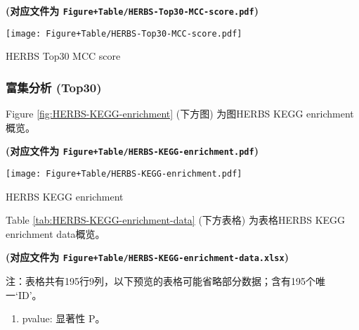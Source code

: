 \documentclass[
]{article}
\providecommand{\tightlist}{%
  \setlength{\itemsep}{0pt}\setlength{\parskip}{0pt}}
\begin{document}
\textbf{(对应文件为 \texttt{Figure+Table/HERBS-Top30-MCC-score.pdf})}

\def\@captype{figure}
\begin{center}
\texttt{[image: Figure+Table/HERBS-Top30-MCC-score.pdf]}
\caption{HERBS Top30 MCC score}\label{fig:HERBS-Top30-MCC-score}
\end{center}

\hypertarget{ux5bccux96c6ux5206ux6790-top30}{%
\subsubsection{富集分析 (Top30)}\label{ux5bccux96c6ux5206ux6790-top30}}

Figure \ref{fig:HERBS-KEGG-enrichment} (下方图) 为图HERBS KEGG enrichment概览。

\textbf{(对应文件为 \texttt{Figure+Table/HERBS-KEGG-enrichment.pdf})}

\def\@captype{figure}
\begin{center}
\texttt{[image: Figure+Table/HERBS-KEGG-enrichment.pdf]}
\caption{HERBS KEGG enrichment}\label{fig:HERBS-KEGG-enrichment}
\end{center}

Table \ref{tab:HERBS-KEGG-enrichment-data} (下方表格) 为表格HERBS KEGG enrichment data概览。

\textbf{(对应文件为 \texttt{Figure+Table/HERBS-KEGG-enrichment-data.xlsx})}

\begin{center}\begin{tcolorbox}[colback=gray!10, colframe=gray!50, width=0.9\linewidth, arc=1mm, boxrule=0.5pt]注：表格共有195行9列，以下预览的表格可能省略部分数据；含有195个唯一`ID'。
\end{tcolorbox}
\end{center}
\begin{center}\begin{tcolorbox}[colback=gray!10, colframe=gray!50, width=0.9\linewidth, arc=1mm, boxrule=0.5pt]\begin{enumerate}\tightlist
\item pvalue:  显著性 P。
\end{enumerate}\end{tcolorbox}
\end{center}
\end{document}
